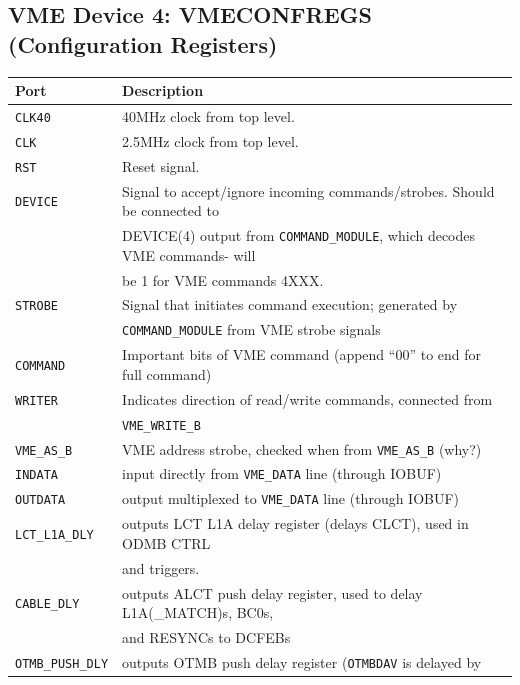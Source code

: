 \documentclass[10pt,a4paper]{article}
\begin{document}
\subsection{VME Device 4: VMECONFREGS (Configuration Registers)}

\begin{table}[H]
\centering
\begin{tabular}{|l|l|} \hline
Port& Description\\ \hline
\texttt{CLK40}& 40MHz clock from top level.\\ \hline
\texttt{CLK}& 2.5MHz clock from top level.\\ \hline
\texttt{RST}& Reset signal.\\ \hline
\texttt{DEVICE}& Signal to accept/ignore incoming commands/strobes. Should be connected to \\
      & DEVICE(4) output from \texttt{COMMAND\_MODULE}, which decodes VME commands- will  \\
			& be 1 for VME commands 4XXX.\\ \hline 
\texttt{STROBE}& Signal that initiates command execution; generated by \\
      & \texttt{COMMAND\_MODULE} from VME strobe signals\\ \hline
\texttt{COMMAND}& Important bits of VME command (append ``00'' to end for full command)\\ \hline
\texttt{WRITER}& Indicates direction of read/write commands, connected from \\
               & \texttt{VME\_WRITE\_B}\\ \hline
\texttt{VME\_AS\_B}& VME address strobe, checked when from \texttt{VME\_AS\_B} (why?)\\ \hline
\texttt{INDATA}& input directly from \texttt{VME\_DATA} line (through IOBUF)\\ \hline
\texttt{OUTDATA}& output multiplexed to \texttt{VME\_DATA} line (through IOBUF)\\ \hline
\texttt{LCT\_L1A\_DLY}& outputs LCT L1A delay register (delays CLCT), used in ODMB CTRL\\
                      & and triggers. \\ \hline
\texttt{CABLE\_DLY}& outputs ALCT push delay register, used to delay L1A(\_MATCH)s, BC0s, \\
                   & and RESYNCs to DCFEBs\\ \hline
\texttt{OTMB\_PUSH\_DLY}& outputs OTMB push delay register (\texttt{OTMBDAV} is delayed by\\

\end{tabular}
\end{table}
\end{document}
